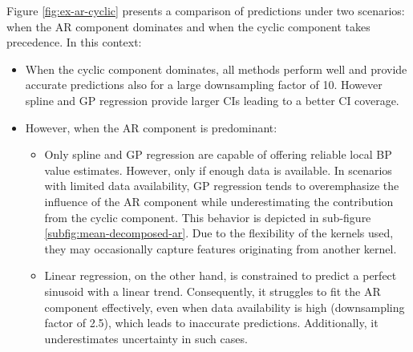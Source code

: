 Figure \ref{fig:ex-ar-cyclic} presents a comparison of predictions under two
scenarios: when the AR component dominates and when the cyclic component takes precedence. In this context:

\begin{itemize}
    \item When the cyclic component dominates, all methods perform well and
    provide accurate predictions also for a large downsampling factor of 10.
    However spline and GP regression provide larger CIs leading to a better
    CI coverage.
    \item However, when the AR component is predominant:

    \begin{itemize}
        \item  Only spline and GP regression are capable of offering reliable local BP value estimates.
        However, only if enough data is available.
        In scenarios with limited data availability, GP regression tends to overemphasize the influence of
        the AR component while underestimating the contribution from the cyclic component.
        This behavior is depicted in sub-figure \ref{subfig:mean-decomposed-ar}.
        Due to the flexibility of the kernels used, they may occasionally capture features originating from another kernel.
        \item Linear regression, on the other hand, is constrained
        to predict a perfect sinusoid with a linear trend.
        Consequently, it struggles to fit the AR component effectively,
        even when data availability is high (downsampling factor of 2.5), which leads to inaccurate predictions.
        Additionally, it underestimates uncertainty in such cases.
    \end{itemize}
\end{itemize}


